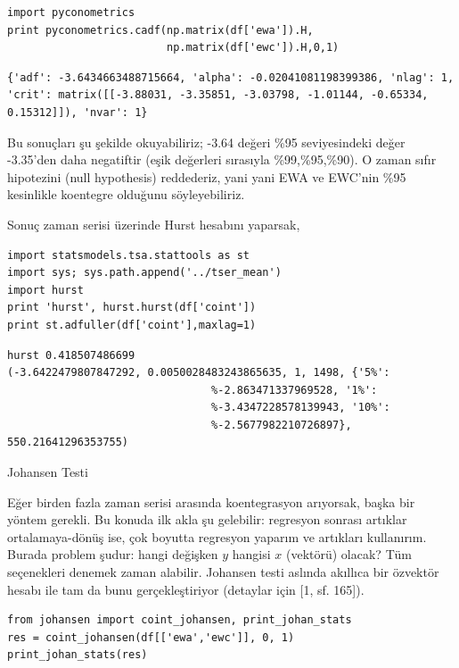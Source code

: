\documentclass[12pt,fleqn]{article}\usepackage{../../common}
\begin{document}
\begin{verbatim}
import pyconometrics
print pyconometrics.cadf(np.matrix(df['ewa']).H,
                         np.matrix(df['ewc']).H,0,1)
\end{verbatim}

\begin{verbatim}
{'adf': -3.6434663488715664, 'alpha': -0.02041081198399386, 'nlag': 1,
'crit': matrix([[-3.88031, -3.35851, -3.03798, -1.01144, -0.65334,
0.15312]]), 'nvar': 1} 
\end{verbatim}

Bu sonuçları şu şekilde okuyabiliriz; -3.64 değeri \%95 seviyesindeki değer
-3.35'den daha negatiftir (eşik değerleri sırasıyla \%99,\%95,\%90). O
zaman sıfır hipotezini (null hypothesis) reddederiz, yani yani EWA ve
EWC'nin \%95 kesinlikle koentegre olduğunu söyleyebiliriz.

Sonuç zaman serisi üzerinde Hurst hesabını yaparsak,

\begin{verbatim}
import statsmodels.tsa.stattools as st
import sys; sys.path.append('../tser_mean')
import hurst 
print 'hurst', hurst.hurst(df['coint'])
print st.adfuller(df['coint'],maxlag=1)
\end{verbatim}

\begin{verbatim}
hurst 0.418507486699
(-3.6422479807847292, 0.0050028483243865635, 1, 1498, {'5%':
                                %-2.863471337969528, '1%':
                                %-3.4347228578139943, '10%':
                                %-2.5677982210726897}, 550.21641296353755) 
\end{verbatim}

Johansen Testi

Eğer birden fazla zaman serisi arasında koentegrasyon arıyorsak, başka bir
yöntem gerekli. Bu konuda ilk akla şu gelebilir: regresyon sonrası artıklar
ortalamaya-dönüş ise, çok boyutta regresyon yaparım ve artıkları
kullanırım. Burada problem şudur: hangi değişken $y$ hangisi $x$ (vektörü)
olacak? Tüm seçenekleri denemek zaman alabilir. Johansen testi aslında
akıllıca bir özvektör hesabı ile tam da bunu gerçekleştiriyor (detaylar
için [1, sf. 165]). 

\begin{verbatim}
from johansen import coint_johansen, print_johan_stats
res = coint_johansen(df[['ewa','ewc']], 0, 1)
print_johan_stats(res)
\end{verbatim}
\end{document}
